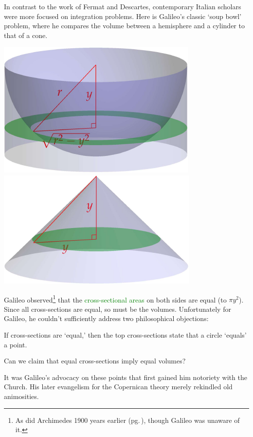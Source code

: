 
In contrast to the work of Fermat and Descartes, contemporary Italian scholars were more focused on integration problems. Here is Galileo's classic `soup bowl' problem, where he compares the volume between a hemisphere and a cylinder to that of a cone.
\begin{center}
	\includegraphics{analytic-soupbowl}
	\qquad\qquad
	\includegraphics{analytic-soupbowl2}
\end{center}

Galileo observed\footnote{%
	As did Archimedes 1900 years earlier (pg.\,\pageref{pg:archmethod}), though Galileo was unaware of it.
}
that the \textcolor{Green}{cross-sectional areas} on both sides are equal (to $\pi y^2$). Since all cross-sections are equal, so must be the volumes. Unfortunately for Galileo, he couldn't sufficiently address two philosophical objections:
\begin{description}\itemsep0pt
  \item[\normalfont\emph{The zero-measure problem}] If cross-sections are `equal,' then the top cross-sections state that a circle `equals' a point.
  \item[\normalfont\emph{Infinitesimals sum to the whole?}] Can we claim that equal cross-sections imply equal volumes?
\end{description}
It was Galileo's advocacy on these points that first gained him notoriety with the Church. His later evangelism for the Copernican theory merely rekindled old animosities.


